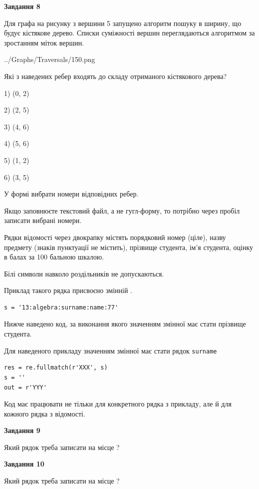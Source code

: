 \documentclass[12pt, ukrainian]{article}
\def\code#1{\Verb!#1!}
\begin{document}
{\begin {large}
{\begin {center}\textbf{Завдання 8}\end {center}}\par
Для графа на рисунку з вершини 5 запущено алгоритм пошуку в ширину, що будує кістякове дерево. Списки суміжності вершин переглядаються алгоритмом за зростанням міток вершин.\par
\begin{center}
	{../Graphs/Traversals/150.png}
\end{center}
\par Які з наведених ребер входять до складу отриманого кістякового дерева?\par
1) (0, 2)\par
2) (2, 5)\par
3) (4, 6)\par
4) (5, 6)\par
5) (1, 2)\par
6) (3, 5)\par
{\vskip 15pt} У формі вибрати номери відповідних ребер.


Якщо заповнюєте текстовий файл, а не гугл-форму, то потрібно через пробіл записа\-ти вибрані номери.\par
\newpage


Рядки відомості через двокрапку містять порядковий номер (ціле), назву предмету (знаків пунктуації не містить), прізвище студента, ім'я студента, оцінку в балах за 100 бальною шкалою.

Білі символи навколо роздільників не допускаються.

Приклад такого рядка присвоєно змінній .



\begin{verbatim}
s = '13:algebra:surname:name:77'
\end{verbatim}


Нижче наведено код, за виконання якого значенням змінної  має стати прізвище студента.

Для наведеного прикладу значенням змінної  має стати рядок \code{surname}



\begin{verbatim}
res = re.fullmatch(r'XXX', s)
s = ''
out = r'YYY'
\end{verbatim}


Код має працювати не тільки для конкретного рядка з прикладу, але й для кожного рядка з відомості.

{\begin {center}\textbf{Завдання 9}\end {center}}\par
Який рядок треба записати на місце  ?\par
\vspace{5mm}


{\begin {center}\textbf{Завдання 10}\end {center}}\par
Який рядок треба записати на місце  ?\par


\newpage


\end {large}}
\end{document}
